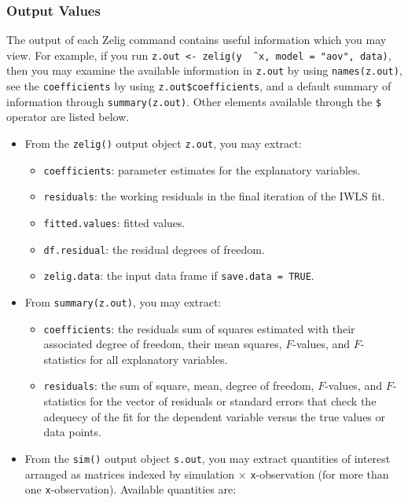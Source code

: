 \subsubsection{Output Values}

The output of each Zelig command contains useful information which you
may view.  For example, if you run \texttt{z.out <- zelig(y \~\,
  x, model = "aov", data)}, then you may examine the available
information in \texttt{z.out} by using \texttt{names(z.out)},
see the {\tt coefficients} by using {\tt z.out\$coefficients}, and
a default summary of information through \texttt{summary(z.out)}.
Other elements available through the {\tt \$} operator are listed
below.

\begin{itemize}
  \item From the {\tt zelig()} output object {\tt z.out}, you may
  extract:
   \begin{itemize}
   \item {\tt coefficients}: parameter estimates for the explanatory
     variables.
   \item {\tt residuals}: the working residuals in the final iteration
     of the IWLS fit.
   \item {\tt fitted.values}: fitted values.
   \item {\tt df.residual}: the residual degrees of freedom.
   \item {\tt zelig.data}: the input data frame if {\tt save.data = TRUE}.  
   \end{itemize}
  
\item From {\tt summary(z.out)}, you may extract:
   \begin{itemize}
   \item {\tt coefficients}: the residuals sum of squares estimated
     with their associated degree of freedom, their mean squares,
     $F$-values, and $F$-statistics for all explanatory variables.
    
   \item {\tt residuals}: the sum of square, mean, degree of freedom,
     $F$-values, and $F$-statistics for the vector of residuals or
     standard errors that check the adequecy of the fit for the
     dependent variable versus the true values or data points.
   
   \end{itemize}
   
\item From the {\tt sim()} output object {\tt s.out}, you may extract
  quantities of interest arranged as matrices indexed by simulation
  $\times$ {\tt x}-observation (for more than one {\tt x}-observation).
  Available quantities are:


\end{itemize}
